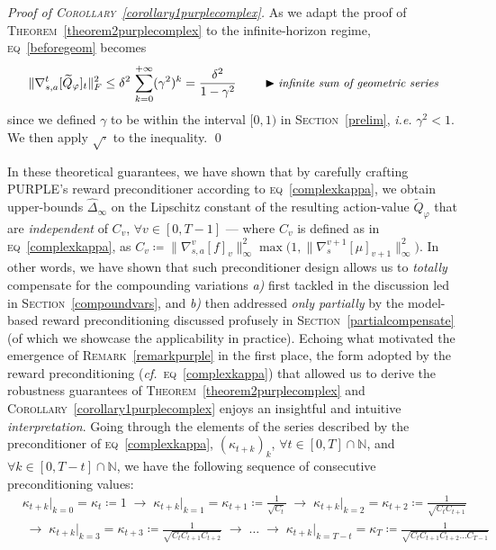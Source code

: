 \emph{Proof of \textsc{Corollary}~\ref{corollary1purplecomplex}.}
As we adapt the proof of \textsc{Theorem}~\ref{theorem2purplecomplex} to
the infinite-horizon regime, \textsc{eq}~\ref{beforegeom} becomes
\begin{align}
\lVert \nabla_{s,a}^t[\widetilde{Q}_\varphi]_t \rVert _F^2
\leq \delta ^2 \, \sum_{k=0}^{+\infty} (\gamma^2)^k
= \frac{\delta ^2}{1 - \gamma^2}
\qquad
\blacktriangleright\text{\small{\textit{infinite sum of geometric series}}}
\end{align}
since we defined $\gamma$ to be within the interval $[0,1)$ in \textsc{Section}~\ref{prelim},
\textit{i.e.} $\gamma^2 < 1$.
We then apply $\sqrt{\cdot}$ to the inequality. \qed

In these theoretical guarantees, we have shown that by carefully crafting PURPLE's reward preconditioner
according to \textsc{eq}~\ref{complexkappa}, we obtain upper-bounds $\widehat{\Delta}_\infty$
on the Lipschitz constant of the resulting
action-value $\widetilde{Q}_\varphi$ that are \emph{independent} of $C_v$,
$\forall v \in [0, T-1]$ --- where $C_v$ is defined as in \textsc{eq}~\ref{complexkappa}, as
$C_v \coloneqq \lVert\nabla_{s,a}^v[f]_v\rVert _\infty^2
\max \big(1, \lVert\nabla_s^{v+1}[\mu]_{v+1}\rVert _\infty^2\big)$.
In other words, we have shown that such preconditioner design allows us to \emph{totally} compensate
for the compounding variations
\textit{a)} first tackled in the discussion led in \textsc{Section}~\ref{compoundvars}, and
\textit{b)} then addressed \emph{only partially} by the model-based reward preconditioning discussed profusely
in \textsc{Section}~\ref{partialcompensate} (of which we showcase the applicability in practice).
Echoing what motivated the emergence of \textsc{Remark}~\ref{remarkpurple} in the first place,
the form adopted by the reward preconditioning (\textit{cf.}~\textsc{eq}~\ref{complexkappa})
that allowed us to derive the robustness guarantees of
\textsc{Theorem}~\ref{theorem2purplecomplex} and
\textsc{Corollary}~\ref{corollary1purplecomplex} enjoys an insightful and intuitive \emph{interpretation}.
Going through the elements of the series described by
the preconditioner of \textsc{eq}~\ref{complexkappa},
$(\kappa_{t+k})_k$,
$\forall t \in [0, T] \cap \mathbb{N}$, and
$\forall k \in [0, T-t] \cap \mathbb{N}$,
we have the following sequence of consecutive preconditioning values:
\begin{align}
&\kappa_{t+k}\big\rvert_{k=0} = \kappa_t \coloneqq 1
\; \rightarrow \;
\kappa_{t+k}\big\rvert_{k=1} = \kappa_{t+1} \coloneqq \frac{1}{\sqrt{C_t}}
\; \rightarrow \;
\kappa_{t+k}\big\rvert_{k=2} = \kappa_{t+2} \coloneqq \frac{1}{\sqrt{C_t C_{t+1}}} \nonumber \\
&\; \rightarrow \;
\kappa_{t+k}\big\rvert_{k=3} = \kappa_{t+3} \coloneqq \frac{1}{\sqrt{C_t C_{t+1} C_{t+2}}}
\; \rightarrow \;
\ldots
\; \rightarrow \;
\kappa_{t+k}\big\rvert_{k=T-t} = \kappa_{T} \coloneqq \frac{1}{\sqrt{C_t C_{t+1} C_{t+2} \ldots C_{T-1}}}
\end{align}
